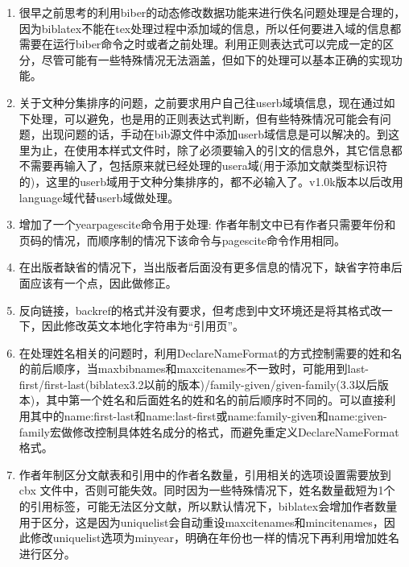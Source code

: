 \label{up:20161114}
\begin{enumerate}
\item 很早之前思考的利用biber的动态修改数据功能来进行佚名问题处理是合理的，因为biblatex不能在tex处理过程中添加域的信息，所以任何要进入域的信息都需要在运行biber命令之时或者之前处理。利用正则表达式可以完成一定的区分，尽管可能有一些特殊情况无法涵盖，但如下的处理可以基本正确的实现功能。

\item 关于文种分集排序的问题，之前要求用户自己往userb域填信息，现在通过如下处理，可以避免，也是用的正则表达式判断，但有些特殊情况可能会有问题，出现问题的话，手动在bib源文件中添加userb域信息是可以解决的。到这里为止，在使用本样式文件时，除了必须要输入的引文的信息外，其它信息都不需要再输入了，包括原来就已经处理的usera域(用于添加文献类型标识符的)，这里的userb域用于文种分集排序的，都不必输入了。v1.0k版本以后改用language域代替userb域做处理。

\item 增加了一个yearpagescite命令用于处理: 作者年制文中已有作者只需要年份和页码的情况，而顺序制的情况下该命令与pagescite命令作用相同。

\item 在出版者缺省的情况下，当出版者后面没有更多信息的情况下，缺省字符串后面应该有一个点，因此做修正。


\item 反向链接，backref的格式并没有要求，但考虑到中文环境还是将其格式改一下，因此修改英文本地化字符串为“引用页”。


\item 在处理姓名相关的问题时，利用DeclareNameFormat的方式控制需要的姓和名的前后顺序，当maxbibnames和maxcitenames不一致时，可能用到last-first/first-last(biblatex3.2以前的版本)/family-given/given-family(3.3以后版本)，其中第一个姓名和后面姓名的姓和名的前后顺序时不同的。可以直接利用其中的name:first-last和name:last-first或name:family-given和name:given-family宏做修改控制具体姓名成分的格式，而避免重定义DeclareNameFormat格式。

\item 作者年制区分文献表和引用中的作者名数量，引用相关的选项设置需要放到cbx 文件中，否则可能失效。同时因为一些特殊情况下，姓名数量截短为1个的引用标签，可能无法区分文献，所以默认情况下，biblatex会增加作者数量用于区分，这是因为uniquelist会自动重设maxcitenames和mincitenames，因此修改uniquelist选项为minyear，明确在年份也一样的情况下再利用增加姓名进行区分。
\end{enumerate}

